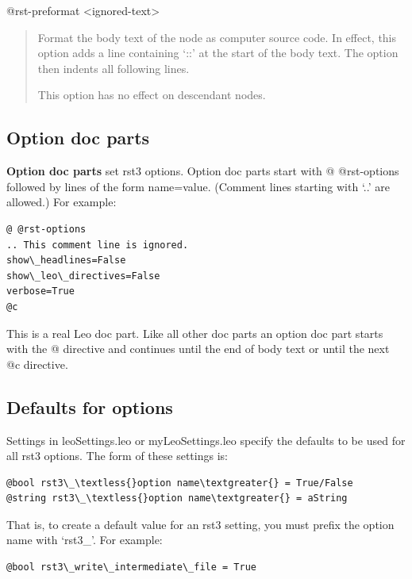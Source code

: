\documentclass[a4paper,10pt,english]{sphinxmanual}
\begin{document}
@rst-preformat \textless{}ignored-text\textgreater{}
\begin{quote}

Format the body text of the node as computer source code. In effect, this
option adds a line containing `::' at the start of the body text. The option
then indents all following lines.

This option has no effect on descendant nodes.
\end{quote}


\subsection{Option doc parts}
\label{rstplugin3:option-doc-parts}
\textbf{Option doc parts} set rst3 options. Option doc parts start with @
@rst-options followed by lines of the form name=value. (Comment lines starting
with `..' are allowed.) For example:

\begin{Verbatim}[commandchars=\\\{\}]
@ @rst-options
.. This comment line is ignored.
show\_headlines=False
show\_leo\_directives=False
verbose=True
@c
\end{Verbatim}

This is a real Leo doc part. Like all other doc parts an option doc part starts
with the @ directive and continues until the end of body text or until the next
@c directive.


\subsection{Defaults for options}
\label{rstplugin3:defaults-for-options}
Settings in leoSettings.leo or myLeoSettings.leo specify the defaults
to be used for all rst3 options.  The form of these settings is:

\begin{Verbatim}[commandchars=\\\{\}]
@bool rst3\_\textless{}option name\textgreater{} = True/False
@string rst3\_\textless{}option name\textgreater{} = aString
\end{Verbatim}

That is, to create a default value for an rst3 setting, you must
prefix the option name with `rst3\_'.  For example:

\begin{Verbatim}[commandchars=\\\{\}]
@bool rst3\_write\_intermediate\_file = True
\end{Verbatim}
\end{document}
